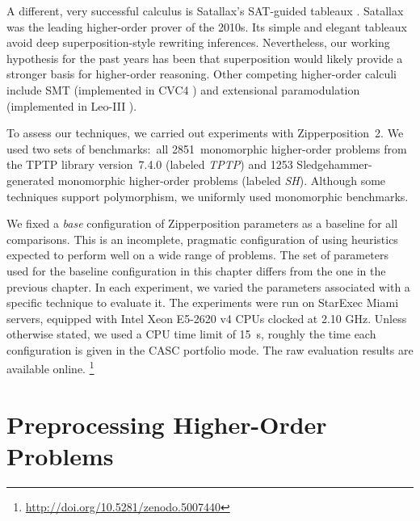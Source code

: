 A different, very successful calculus is Satallax's SAT-guided tableaux
\cite{backes-brown-2011}. Satallax was the leading higher-order prover of the
2010s. Its simple and elegant tableaux avoid deep superposition-style rewriting
inferences.
Nevertheless, our working hypothesis for the past years has been
that superposition would likely provide a stronger basis for higher-order
reasoning.
Other competing higher-order calculi include SMT (implemented in CVC4
\cite{brotb-19-ho-smt, cbetal-11-cvc4}) and extensional paramodulation (implemented in Leo-III \cite{sb-21-leo3}).

To assess our techniques, we carried out experiments with Zipperposition~2. We
used two sets of benchmarks:\ all 2851~monomorphic higher-order problems from the
TPTP library \cite{gs-17-tptp} version~7.4.0 (labeled \emph{TPTP})
and 1253 Sledgehammer-generated
monomorphic higher-order problems (labeled \emph{SH}).
Although some techniques support polymorphism, we
uniformly used monomorphic benchmarks.

We fixed a \emph{base} configuration
of Zipperposition parameters as a baseline for all comparisons. This is an
incomplete, pragmatic configuration of \osup{} using heuristics expected to perform
well on a wide range of problems. The set of parameters used for the baseline configuration in this
chapter differs from the one in the previous chapter.
In each experiment, we varied
the parameters associated with a specific technique to evaluate it. The
experiments were run on StarExec Miami \cite{sst-14-starexec} servers, equipped with
Intel Xeon E5-2620 v4 CPUs clocked at 2.10 GHz. Unless otherwise stated, we used a
CPU time limit of 15~s, roughly the time each configuration is given in the
CASC portfolio mode. The raw evaluation results are available online.%
\footnote{\url{http://doi.org/10.5281/zenodo.5007440}}

\section{Preprocessing Higher-Order Problems}
\label{sec:ho-tech:preprocessing}


